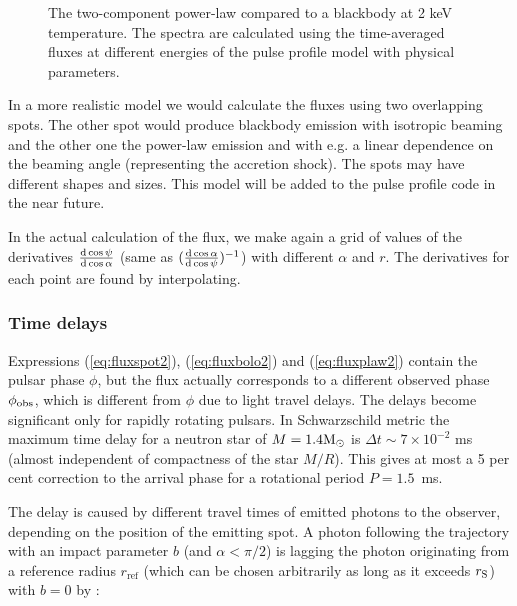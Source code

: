 \documentclass{wihuri}
\def\rg{r_{\rm S}} %
\def\msun{{\rm M_{\odot}}}
\def\d{{\rm d}}
\def\rg{r_{\rm S}} %
\def\phiobs{\phi_{\rm obs}}
\begin{document}
\begin{figure}
\centerline{}
\caption{The two-component power-law compared to a blackbody at 2 keV temperature. The spectra are calculated using the time-averaged fluxes at different energies of the pulse profile model with physical parameters. 
\label{fig:spectrum}}
\end{figure}


In a more realistic model we would calculate the fluxes using two overlapping spots. The other spot would produce blackbody emission with isotropic beaming and the other one the power-law emission and with e.g. a linear dependence on the beaming angle (representing the accretion shock). The spots may have different shapes and sizes. This model will be added to the pulse profile code in the near future.


In the actual calculation of the flux, we make again a grid of values of the derivatives $\frac{\d\cos\psi}{\d\cos\alpha}$ (same as $(\frac{\d\cos\alpha}{\d\cos\psi})^{-1}$) with different $\alpha$ and $r$. The derivatives for each point are found by interpolating. 


\subsubsection{Time delays}



Expressions (\ref{eq:fluxspot2}), (\ref{eq:fluxbolo2}) and (\ref{eq:fluxplaw2}) 
contain the pulsar phase $\phi$, but the flux actually corresponds to a different 
observed phase $\phiobs$, which is different from $\phi$ due to light travel delays.  
The delays become significant only for rapidly rotating pulsars.
In Schwarzschild metric the maximum time delay for a neutron star
of $M=1.4\msun$ is $\Delta t\sim 7\times 10^{-2}$ ms (almost independent
of compactness of the star $M/R$). This gives at most 
a 5 per cent correction to the arrival phase for a rotational period $P=1.5$~ms.

   
The delay is caused by different travel times of emitted
photons to the observer, depending on the position of the emitting spot.
A photon following the trajectory with an impact parameter $b$ (and $\alpha < \pi/2$)
is lagging the photon originating from a reference radius $r_{\mathrm{ref}}$ (which can be chosen arbitrarily as long as it exceeds $\rg$) with $b=0$ by \cite{pechenick}%
:
\end{document}
